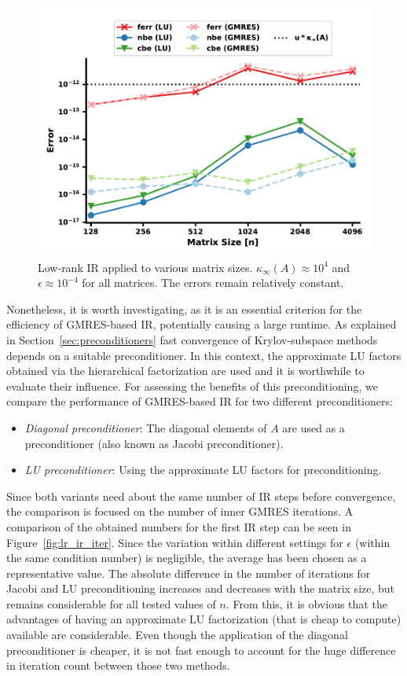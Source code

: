 \begin{figure}[h]
    \centering
    \includegraphics[width=0.7\linewidth]{chapters/5_experiments/figures/LR_size.pdf}
    \caption[Low-Rank IR - Matrix Size]{Low-rank IR applied to various matrix sizes. $\kappa_\infty(A) \approx 10^4$ and $\epsilon \approx 10^{-4}$ for all matrices. The errors remain relatively constant.}
    \label{fig:lr_ir_size}
\end{figure}

Nonetheless, it is worth investigating, as it is an essential criterion for the efficiency of GMRES-based IR, potentially causing a large runtime. As explained in Section~\hyperref[sec:preconditioners]{\ref{sec:preconditioners}} fast convergence of Krylov-subspace methods depends on a suitable preconditioner. In this context, the approximate LU factors obtained via the hierarchical factorization are used and it is worthwhile to evaluate their influence. For assessing the benefits of this preconditioning, we compare the performance of GMRES-based IR for two different preconditioners:
\begin{itemize}
    \item \textit{Diagonal preconditioner}: The diagonal elements of $A$ are used as a preconditioner (also known as Jacobi preconditioner).
    \item \textit{LU preconditioner}: Using the approximate LU factors for preconditioning.
\end{itemize}

\noindent Since both variants need about the same number of IR steps before convergence, the comparison is focused on the number of inner GMRES iterations. A comparison of the obtained numbers for the first IR step can be seen in Figure~\hyperref[fig:lr_ir_iter]{\ref{fig:lr_ir_iter}}. Since the variation within different settings for $\epsilon$ (within the same condition number) is negligible, the average has been chosen as a representative value. The absolute difference in the number of iterations for Jacobi and LU preconditioning increases and decreases with the matrix size, but remains considerable for all tested values of $n$. From this, it is obvious that the advantages of having an approximate LU factorization (that is cheap to compute) available are considerable. Even though the application of the diagonal preconditioner is cheaper, it is not fast enough to account for the huge difference in iteration count between those two methods. 


